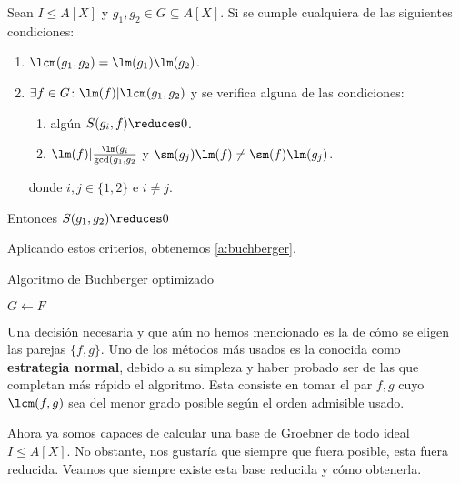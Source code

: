 \begin{teorema}\label{t:criterios}
    Sean $I\le A[X]$ y $g_1,g_2 \in G\subseteq A[X]$. Si se cumple cualquiera de las siguientes condiciones:
    \begin{enumerate}
        \item $\lcm(g_1,g_2) = \lm(g_1)\lm(g_2)$.
        \item $\exists f\in G \colon \lm(f) \vert \lcm(g_1,g_2)$ y se verifica alguna de las condiciones:
        \begin{enumerate}
            \item algún $S(g_i,f)\reduces 0$.
            \item $\lm(f)\vert \frac{\lm(g_i}{\gcd(g_1,g_2}$ y $\sm(g_j)\lm(f) \neq \sm(f)\lm(g_j)$.
        \end{enumerate}
        donde $i,j\in\{1,2\}$ e $i\neq j$.
    \end{enumerate}
    Entonces $S(g_1,g_2)\reduces 0$
\end{teorema}

 Aplicando estos criterios, obtenemos \autoref{a:buchberger}.
 
\begin{algorithm}[hbt!]
    \caption{Algoritmo de Buchberger optimizado}\label{a:buchberger}

    $G\gets F$\;


\end{algorithm}

\begin{observacion}
    Una decisión necesaria y que aún no hemos mencionado es la de cómo se eligen las parejas $\{f,g\}$. Uno de los métodos más usados es la conocida como \textbf{estrategia normal}, debido a su simpleza y haber probado ser de las que completan más rápido el algoritmo. Esta consiste en tomar el par $f,g$ cuyo $\lcm(f,g)$ sea del menor grado posible según el orden admisible usado.
\end{observacion}

Ahora ya somos capaces de calcular una base de Groebner de todo ideal $I\le A[X]$. No obstante, nos gustaría que siempre que fuera posible, esta fuera reducida. Veamos que siempre existe esta base reducida y cómo obtenerla.

